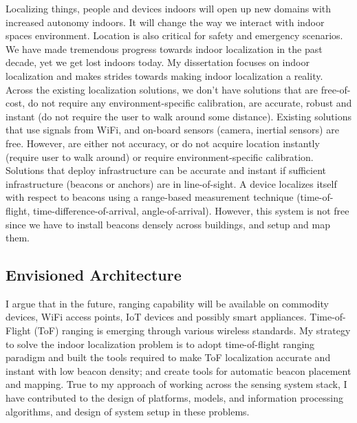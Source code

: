 \documentclass[10pt]{article}
\begin{document}
Localizing things, people and devices indoors will open up new domains with increased autonomy indoors. It will change the way we interact with indoor spaces environment. Location is also critical for safety and emergency scenarios. %
We have made tremendous progress towards indoor localization in the past decade, yet we get lost indoors today. My dissertation focuses on indoor localization and makes strides towards making indoor localization a reality. Across the existing localization solutions, 
we don't have solutions that are free-of-cost, do not require any environment-specific calibration, are accurate, robust and instant (do not require the user to walk around some distance). Existing solutions that use signals from WiFi, and on-board sensors (camera, inertial sensors) are free. However, are either not accuracy, or do not acquire location instantly (require user to walk around) or require environment-specific calibration. Solutions that deploy infrastructure can be accurate and instant if sufficient infrastructure (beacons or anchors) are in line-of-sight. A device localizes itself with respect to beacons using a range-based measurement technique (time-of-flight, time-difference-of-arrival, angle-of-arrival). However, this system is not free since we have to install beacons densely across buildings, and setup and map them. \\

\subsection{Envisioned Architecture}
I argue that in the future, ranging capability will be available on commodity devices, WiFi access points, IoT devices and possibly smart appliances. 
Time-of-Flight (ToF) ranging is emerging through various wireless standards. My strategy to solve the indoor localization problem is to adopt time-of-flight ranging paradigm and built the tools required to make ToF localization accurate and instant with low beacon density; and create tools for automatic beacon placement and mapping. True to my approach of working across the sensing system stack, I have contributed to the design of platforms, models, and information processing algorithms, and design of system setup in these problems.\\
\end{document}
